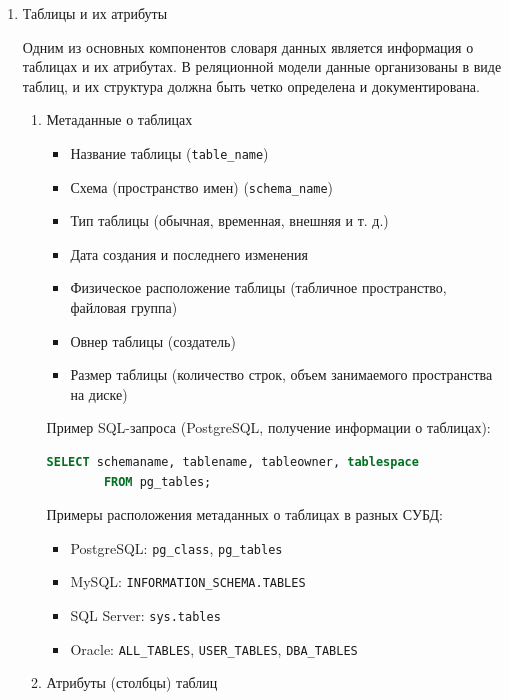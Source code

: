 \begin{enumerate}

    \item Таблицы и их атрибуты

    Одним из основных компонентов словаря данных является информация о таблицах и их атрибутах. В реляционной модели данные организованы в виде таблиц, и их структура должна быть четко определена и документирована.

    \begin{enumerate}
        \item Метаданные о таблицах

        \begin{itemize}
            \item Название таблицы (\texttt{table\_name})
            \item Схема (пространство имен) (\texttt{schema\_name})
            \item Тип таблицы (обычная, временная, внешняя и т. д.)
            \item Дата создания и последнего изменения
            \item Физическое расположение таблицы (табличное пространство, файловая группа)
            \item Овнер таблицы (создатель)
            \item Размер таблицы (количество строк, объем занимаемого пространства на диске)
        \end{itemize}

        Пример SQL-запроса (PostgreSQL, получение информации о таблицах):
        \begin{lstlisting}[language=SQL]
        SELECT schemaname, tablename, tableowner, tablespace 
        FROM pg_tables;
        \end{lstlisting}

        Примеры расположения метаданных о таблицах в разных СУБД:
        \begin{itemize}
            \item PostgreSQL: \texttt{pg\_class}, \texttt{pg\_tables}
            \item MySQL: \texttt{INFORMATION\_SCHEMA.TABLES}
            \item SQL Server: \texttt{sys.tables}
            \item Oracle: \texttt{ALL\_TABLES}, \texttt{USER\_TABLES}, \texttt{DBA\_TABLES}
        \end{itemize}

        \item Атрибуты (столбцы) таблиц
    

\end{enumerate}
\end{enumerate}
